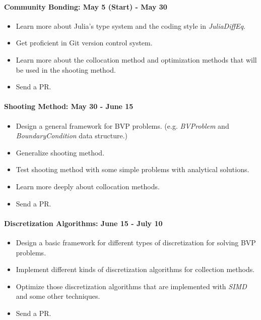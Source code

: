 \documentclass[a4paper,12pt,onecolumn]{article}
\begin{document}
\paragraph{Community Bonding: May 5 (Start) - May 30} %
\label{par:community_bonding}
\begin{itemize}
	\item Learn more about Julia's type system and the coding style in \textit{JuliaDiffEq}.
	\item Get proficient in Git version control system.
	\item Learn more about the collocation method and optimization methods that will be
	used in the shooting method.
	\item Send a PR.
\end{itemize}

\paragraph{Shooting Method: May 30 - June 15} %
\label{par:shooting_method_may_30_june_15}
\begin{itemize}
	\item Design a general framework for BVP problems. (e.g. \textit{BVProblem} and \textit{
	BoundaryCondition} data structure.)
	\item Generalize shooting method.
	\item Test shooting method with some simple problems with analytical solutions.
	\item Learn more deeply about collocation methods.
	\item Send a PR.
\end{itemize}

\paragraph{Discretization Algorithms: June 15 - July 10} %
\label{par:discretization_algorithms}
\begin{itemize}
	\item Design a basic framework for different types of discretization for solving
	BVP problems.
	\item Implement different kinds of discretization algorithms for collection methods.
	\item Optimize those discretization algorithms that are implemented with \textit{SIMD}
	and some other techniques.
	\item Send a PR.
\end{itemize}
\end{document}
